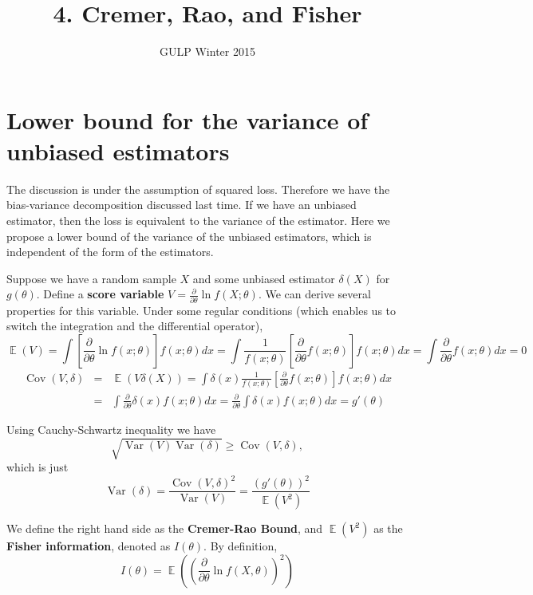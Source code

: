 \documentclass[12pt]{article}
\newcommand{\1}{\mathbbm{1}}
\newcommand{\E}{\operatorname{\mathbb{E}}}
\newcommand{\var}[1]{\operatorname{Var}\left(#1\right)}
\newcommand{\cov}[1]{\operatorname{Cov}\left(#1\right)}
\begin{document}
\title{4. Cremer, Rao, and Fisher}%
\author{GULP Winter 2015} %
\maketitle

\section{Lower bound for the variance of unbiased estimators}

The discussion is under the assumption of squared loss. Therefore we have the bias-variance decomposition discussed last time. If we have an unbiased estimator, then the loss is equivalent to the variance of the estimator. Here we propose a lower bound of the variance of the unbiased estimators, which is independent of the form of the estimators.

Suppose we have a random sample $X$ and some unbiased estimator $\delta(X)$ for $g(\theta)$. Define a \textbf{score variable} $V = \frac{\partial}{\partial \theta} \ln f(X;\theta)$. We can derive several properties for this variable. Under some regular conditions (which enables us to switch the integration and the differential operator), 
$$
\E (V) = \int  [\frac{\partial}{\partial \theta} \ln f(x;\theta)] f(x;\theta) dx = \int \frac{1}{f(x;\theta)}[\frac{\partial}{\partial \theta} f(x;\theta)] f(x;\theta) dx = \int \frac{\partial}{\partial \theta} f(x;\theta)  dx = 0
$$
\begin{eqnarray*}
\cov{V,\delta}& =& \E (V\delta(X) ) = \int \delta(x) \frac{1}{f(x;\theta)}[\frac{\partial}{\partial \theta} f(x;\theta)] f(x;\theta) dx\\& =&  \int \frac{\partial}{\partial \theta} \delta(x) f(x;\theta)  dx =  \frac{\partial}{\partial \theta} \int \delta(x) f(x;\theta)  dx = g'(\theta)
\end{eqnarray*}

Using Cauchy-Schwartz inequality we have
$$
\sqrt{\var{V} \var{\delta}} \geq \cov{V,\delta},
$$
which is just
$$
\var{\delta} = \frac{\cov{V,\delta}^2}{\var{V}} = \frac{(g'(\theta))^2}{\E (V^2)}
$$

We define the right hand side as the \textbf{Cremer-Rao Bound}, and $\E (V^2) $ as the \textbf{Fisher information}, denoted as $I(\theta)$. By definition, 
$$
I(\theta) = \E ((\frac{\partial}{\partial \theta} \ln f(X,\theta))^2)
$$
\end{document}
